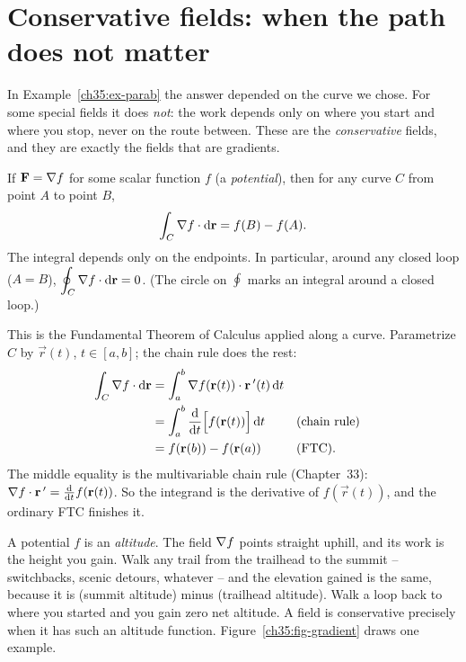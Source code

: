 \section{Conservative fields: when the path does not matter}
\label{ch35:conservative}

In Example~\ref{ch35:ex-parab} the answer depended on the curve we chose. For some
special fields it does \emph{not}: the work depends only on where you start and
where you stop, never on the route between. These are the \emph{conservative}
fields, and they are exactly the fields that are gradients.

\begin{theorem}
\label{ch35:thm-gradient}
If $\mathbf{F} = \nabla f$ for some scalar function $f$ (a \emph{potential}), then for
any curve $C$ from point $A$ to point $B$,
\[
  \int_C \nabla f\cdot \mathrm{d}\mathbf{r} = f(B) - f(A).
\]
The integral depends only on the endpoints. In particular, around any closed loop
($A=B$), $\displaystyle\oint_C \nabla f\cdot\mathrm{d}\mathbf{r} = 0$. (The circle on
$\oint$ marks an integral around a closed loop.)
\end{theorem}

\begin{whybox}
This is the Fundamental Theorem of Calculus applied along a curve. Parametrize $C$ by
$\vec r(t)$, $t\in[a,b]$; the chain rule does the rest:
\begin{align*}
  \int_C \nabla f\cdot\mathrm{d}\mathbf{r}
  &= \int_a^b \nabla f(\mathbf{r}(t))\cdot \mathbf{r}\,'(t)\,\mathrm{d} t\\
  &= \int_a^b \frac{\mathrm{d}}{\mathrm{d} t}\Big[f(\mathbf{r}(t))\Big]\,\mathrm{d} t
  && \text{(chain rule)}\\
  &= f(\mathbf{r}(b)) - f(\mathbf{r}(a)) && \text{(FTC)}.
\end{align*}
The middle equality is the multivariable chain rule (Chapter~33):
$\nabla f\cdot\mathbf{r}\,' = \frac{\mathrm{d} }{\mathrm{d} t}f(\mathbf{r}(t))$. So the integrand is the
derivative of $f(\vec r(t))$, and the ordinary FTC finishes it.
\end{whybox}

\begin{intuitionbox}
A potential $f$ is an \emph{altitude}. The field $\nabla f$ points straight uphill,
and its work is the height you gain. Walk any trail from the trailhead to the
summit -- switchbacks, scenic detours, whatever -- and the elevation gained is the
same, because it is (summit altitude) minus (trailhead altitude). Walk a loop
back to where you started and you gain zero net altitude. A field is conservative
precisely when it has such an altitude function. Figure~\ref{ch35:fig-gradient}
draws one example.
\end{intuitionbox}

